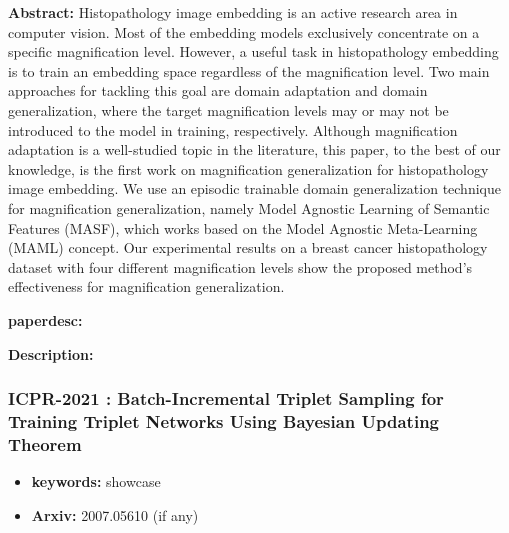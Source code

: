 \documentclass{article}
\begin{document}

\textbf{Abstract:} Histopathology image embedding is an active research area in computer vision. Most of the embedding models exclusively concentrate on a specific magnification level. However, a useful task in histopathology embedding is to train an embedding space regardless of the magnification level. Two main approaches for tackling this goal are domain adaptation and domain generalization, where the target magnification levels may or may not be introduced to the model in training, respectively. Although magnification adaptation is a well-studied topic in the literature, this paper, to the best of our knowledge, is the first work on magnification generalization for histopathology image embedding. We use an episodic trainable domain generalization technique for magnification generalization, namely Model Agnostic Learning of Semantic Features (MASF), which works based on the Model Agnostic Meta-Learning (MAML) concept. Our experimental results on a breast cancer histopathology dataset with four different magnification levels show the proposed method's effectiveness for magnification generalization.

\textbf{paperdesc:} 

\textbf{Description:} 



\newpage
\subsubsection{\textbf{ICPR-2021} : Batch-Incremental Triplet Sampling for Training Triplet Networks Using Bayesian Updating Theorem}
\begin{itemize}
\item \textbf{keywords:} showcase
\item \textbf{Arxiv:} 2007.05610 (if any)
\end{itemize}
\end{document}
